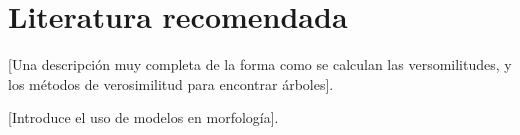 \section*{Literatura recomendada}

\cite{Swofford1996} [Una descripci\'on muy completa de la forma como se calculan las versomilitudes, y los m\'etodos de verosimilitud para encontrar \'arboles].

\cite{Lewis2001} [Introduce el uso de modelos en morfolog\'ia].
